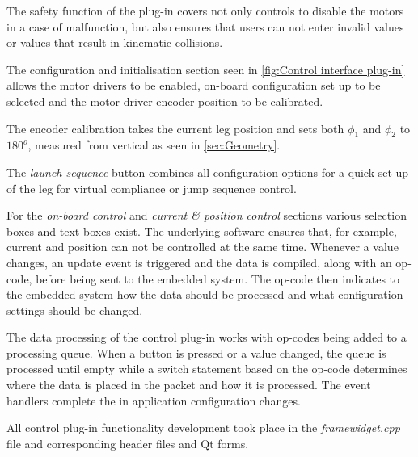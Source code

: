 The safety function of the plug-in covers not only controls to disable the motors in a case of malfunction, but also ensures that users can not enter invalid values or values that result in kinematic collisions.

The configuration and initialisation section seen in \cref{fig:Control interface plug-in} allows the motor drivers to be enabled, on-board configuration set up to be selected and the motor driver encoder position to be calibrated. 

The encoder calibration takes the current leg position and sets both $\phi_1$ and $\phi_2$ to $180^o$, measured from vertical as seen in \cref{sec:Geometry}.

The \textit{launch sequence} button combines all configuration options for a quick set up of the leg for virtual compliance or jump sequence control.

For the \textit{on-board control} and \textit{current \& position control} sections various selection boxes and text boxes exist. The underlying software ensures that, for example, current and position can not be controlled at the same time. Whenever a value changes, an update event is triggered and the data is compiled, along with an op-code, before being sent to the embedded system. The op-code then indicates to the embedded system how the data should be processed and what configuration settings should be changed.

The data processing of the control plug-in works with op-codes being added to a processing queue. When a button is pressed or a value changed, the queue is processed until empty while a switch statement based on the op-code determines where the data is placed in the packet and how it is processed. The event handlers complete the in application configuration changes.

All control plug-in functionality development took place in the \textit{framewidget.cpp} file and corresponding header files and Qt forms.

